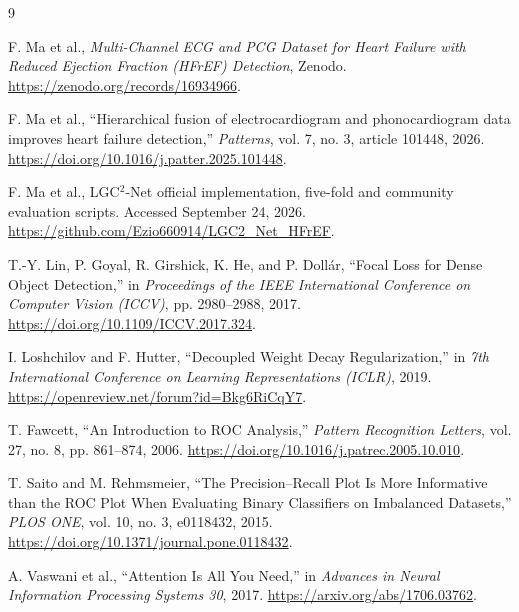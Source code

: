 \documentclass[11pt,a4paper]{article}
\begin{document}
\begin{thebibliography}{9}

F. Ma et al.,
\textit{Multi-Channel ECG and PCG Dataset for Heart Failure with Reduced
Ejection Fraction (HFrEF) Detection}, Zenodo.
\url{https://zenodo.org/records/16934966}.

F. Ma et al.,
``Hierarchical fusion of electrocardiogram and phonocardiogram data
improves heart failure detection,''
\textit{Patterns}, vol. 7, no. 3, article 101448, 2026.
\url{https://doi.org/10.1016/j.patter.2025.101448}.

F. Ma et al., LGC$^{2}$-Net official implementation,
five-fold and community evaluation scripts. Accessed September 24, 2026.
\url{https://github.com/Ezio660914/LGC2_Net_HFrEF}.

T.-Y. Lin, P. Goyal, R. Girshick, K. He, and P. Dollár,
``Focal Loss for Dense Object Detection,''
in \textit{Proceedings of the IEEE International Conference on Computer Vision (ICCV)},
pp. 2980--2988, 2017.
\url{https://doi.org/10.1109/ICCV.2017.324}.

I. Loshchilov and F. Hutter,
``Decoupled Weight Decay Regularization,''
in \textit{7th International Conference on Learning Representations (ICLR)}, 2019.
\url{https://openreview.net/forum?id=Bkg6RiCqY7}.

T. Fawcett,
``An Introduction to ROC Analysis,''
\textit{Pattern Recognition Letters}, vol. 27, no. 8, pp. 861--874, 2006.
\url{https://doi.org/10.1016/j.patrec.2005.10.010}.

T. Saito and M. Rehmsmeier,
``The Precision--Recall Plot Is More Informative than the ROC Plot When Evaluating Binary Classifiers on Imbalanced Datasets,''
\textit{PLOS ONE}, vol. 10, no. 3, e0118432, 2015.
\url{https://doi.org/10.1371/journal.pone.0118432}.

A. Vaswani et al.,
``Attention Is All You Need,''
in \textit{Advances in Neural Information Processing Systems 30}, 2017.
\url{https://arxiv.org/abs/1706.03762}.


\end{thebibliography}
\end{document}
